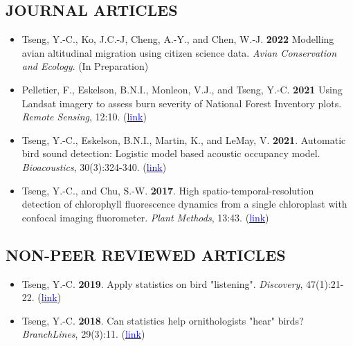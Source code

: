 \documentclass[11pt,letterpaper,sans]{moderncv}        %
\begin{document}
\subsection{JOURNAL ARTICLES}
\begin{itemize}

\item{Tseng, Y.-C., Ko, J.C.-J, Cheng, A.-Y., and Chen, W.-J. \textbf{2022} Modelling avian altitudinal migration using citizen science data. \textit{Avian Conservation and Ecology}. (In Preparation)}
\vspace{3pt}


\item{Pelletier, F., Eskelson, B.N.I., Monleon, V.J., and Tseng, Y.-C. \textbf{2021} Using Landsat imagery to assess burn severity of National Forest Inventory plots. \textit{Remote Sensing}, 12:10. (\href{https://www.mdpi.com/2072-4292/13/10/1935}{\textcolor{blue}{link}})}
\vspace{3pt}


\item{Tseng, Y.-C., Eskelson, B.N.I., Martin, K., and LeMay, V. \textbf{2021}. Automatic bird sound detection: Logistic model based acoustic occupancy model. \textit{Bioacoustics}, 30(3):324-340. (\href{https://www.tandfonline.com/doi/abs/10.1080/09524622.2020.1730241}{\textcolor{blue}{link}})

}
\vspace{3pt}


\item{Tseng, Y.-C., and Chu, S.-W. \textbf{2017}. High spatio-temporal-resolution detection of chlorophyll fluorescence dynamics from a single chloroplast with confocal imaging fluorometer. \textit{Plant Methods}, 13:43. (\href{https://doi.org/10.1186/s13007-017-0194-2}{\textcolor{blue}{link}})}
\end{itemize}

\subsection{NON-PEER REVIEWED ARTICLES}
\begin{itemize}

\item{Tseng, Y.-C. \textbf{2019}. Apply statistics on bird "listening". \textit{Discovery}}, 47(1):21-22. (\href{https://drive.google.com/open?id=1lZC8H246lFH-XCGI6vtBjXMIq1YqukUG}{\textcolor{blue}{link}})
\vspace{3pt}

\item{Tseng, Y.-C. \textbf{2018}. Can statistics help ornithologists "hear" birds? \textit{BranchLines}}, 29(3):11. (\href{https://forestry.ubc.ca/files/2019/04/bl-29.3.pdf#page=11}{\textcolor{blue}{link}}) 
\vspace{3pt}
\end{itemize}
\end{document}
